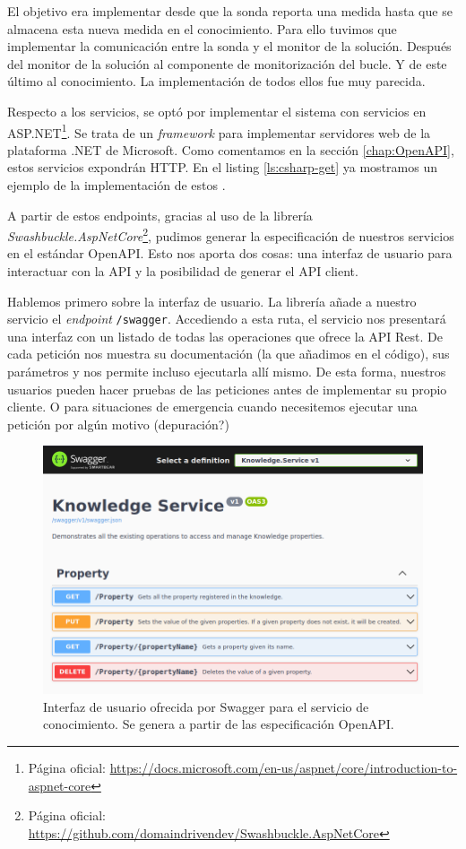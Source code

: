 El objetivo era implementar desde que la sonda reporta una medida hasta que se almacena esta nueva medida en el conocimiento. Para ello tuvimos que implementar la comunicación entre la sonda y el monitor de la solución. Después del monitor de la solución al componente de monitorización del bucle. Y de este último al conocimiento. La implementación de todos ellos fue muy parecida.

Respecto a los servicios, se optó por implementar el sistema con servicios en ASP.NET\footnote{Página oficial: \url{https://docs.microsoft.com/en-us/aspnet/core/introduction-to-aspnet-core}}. Se trata de un \emph{framework} para implementar servidores web de la plataforma .NET de Microsoft. Como comentamos en la sección \ref{chap:OpenAPI}, estos servicios expondrán  HTTP. En el listing \ref{ls:csharp-get} ya mostramos un ejemplo de la implementación de estos .

A partir de estos endpoints, gracias al uso de la librería \emph{Swashbuckle.AspNetCore}\footnote{Página oficial: \url{https://github.com/domaindrivendev/Swashbuckle.AspNetCore}}, pudimos generar la especificación de nuestros servicios en el estándar OpenAPI. Esto nos aporta dos cosas: una interfaz de usuario para interactuar con la API y la posibilidad de generar el API client.

Hablemos primero sobre la interfaz de usuario. La librería añade a nuestro servicio el \emph{endpoint} \texttt{/swagger}. Accediendo a esta ruta, el servicio nos presentará una interfaz con un listado de todas las operaciones que ofrece la API Rest. De cada petición nos muestra su documentación (la que añadimos en el código), sus parámetros y nos permite incluso ejecutarla allí mismo. De esta forma, nuestros usuarios pueden hacer pruebas de las peticiones antes de implementar su propio cliente. O para situaciones de emergencia cuando necesitemos ejecutar una petición por algún motivo (depuración?)

\begin{figure}[htb]
  \centering
  \includegraphics[scale=1.5]{cap_implementacion/images/swagger-knowledge-ui}
  \caption{Interfaz de usuario ofrecida por Swagger para el servicio de conocimiento. Se genera a partir de las especificación OpenAPI.}
  \label{fig:swagger-knowledge-ui}
\end{figure}

